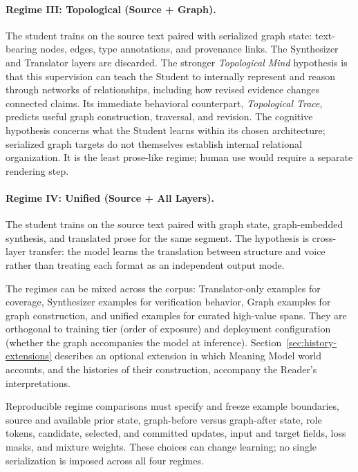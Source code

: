 \documentclass[11pt]{article}
\begin{document}
\paragraph{Regime III: Topological (Source + Graph).} The student trains on the
source text paired with serialized graph state: text-bearing nodes, edges, type
annotations, and provenance links. The Synthesizer and Translator layers are
discarded. The stronger \emph{Topological Mind}
hypothesis\label{sec:topological-mind} is that this supervision can teach the
Student to internally represent and reason through networks of relationships,
including how revised evidence changes connected claims. Its immediate
behavioral counterpart, \emph{Topological Trace}, predicts useful graph
construction, traversal, and revision. The cognitive hypothesis concerns what
the Student learns within its chosen architecture; serialized graph targets
do not themselves establish internal
relational organization. It is the least prose-like regime; human use would
require a separate rendering step.

\paragraph{Regime IV: Unified (Source + All Layers).} The student trains on the
source text paired with graph state, graph-embedded synthesis, and translated
prose for the same segment. The hypothesis is cross-layer transfer: the model
learns the translation between structure and voice rather than treating each
format as an independent output mode.

The regimes can be mixed across the corpus: Translator-only examples for
coverage, Synthesizer examples for verification behavior, Graph examples for
graph construction, and unified examples for curated high-value spans. They
are orthogonal to training tier (order of exposure) and deployment
configuration (whether the graph accompanies the model at inference).
Section~\ref{sec:history-extensions} describes an optional extension in which
Meaning Model world accounts, and the histories of their construction,
accompany the Reader's interpretations.

Reproducible regime comparisons must specify and freeze example boundaries,
source and available prior state,
graph-before versus graph-after state, role tokens, candidate, selected, and committed
updates, input and target fields, loss masks, and mixture weights. These choices
can change learning; no single serialization is imposed across all four
regimes.
\end{document}

